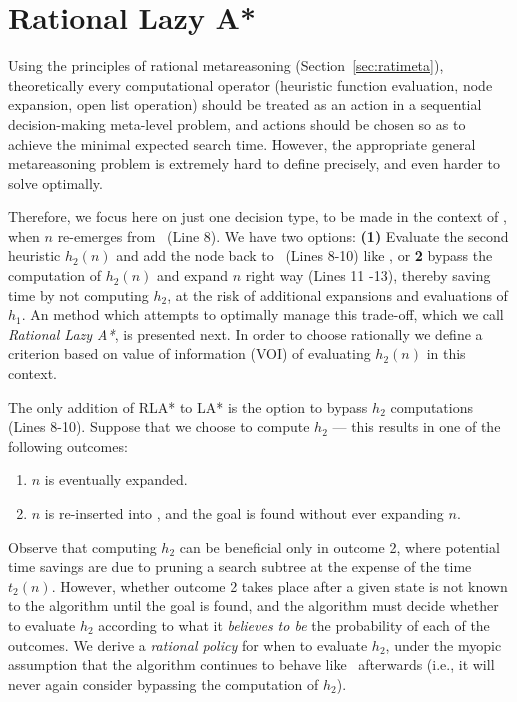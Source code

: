 \section{Rational Lazy A*}

Using the principles of rational metareasoning (Section~\ref{sec:ratimeta}),
theoretically every computational operator (heuristic function evaluation, node
expansion, open list operation) should be treated as an action in a sequential
decision-making meta-level problem, and actions should be chosen so as to
achieve the minimal expected search time. However, the appropriate
general metareasoning problem is extremely hard to define precisely, and even harder
to solve optimally.

Therefore, we focus here on just one decision type, to be
made in the context of \lazyastar, when $n$ re-emerges from \OPEN~(Line 8).
We have two options: {\bf (1)}  Evaluate the second heuristic $h_2(n)$ and add
the node back to \OPEN~(Lines 8-10) like \lazyastar, or {\bf 2} bypass the
computation of $h_2(n)$ and expand $n$ right way (Lines 11 -13), thereby
saving time by not computing $h_2$, at the risk of additional expansions and evaluations of $h_1$.
An method which attempts to
optimally manage this trade-off, which we call \textit{Rational Lazy A*}, is presented next.
In order to choose rationally we define a criterion based on value of
information (VOI) of evaluating $h_2(n)$ in this context.

The only addition of RLA* to LA* is the option to bypass $h_2$ computations (Lines 8-10).
Suppose that we choose to compute $h_2$ --- this results in one of the
following outcomes:
\begin{enumerate}
\item $n$ is eventually expanded.
\item $n$ is re-inserted into \OPEN, and the goal is found without ever expanding $n$.
\end{enumerate}

Observe that computing $h_2$ can be beneficial only in outcome 2, where
potential time savings are due to pruning a search subtree at the expense of
the time $t_2(n)$. However, whether outcome 2 takes place after a given state
is not known to the algorithm until the goal is found, and the algorithm must
decide whether to evaluate $h_2$ according to what it \textit{believes to be}
the probability of each of the outcomes. We derive a \textit{rational policy}
for when to evaluate $h_2$, under the myopic assumption that the algorithm
continues to behave like \lazyastar~afterwards (i.e., it will never again
consider bypassing the computation of $h_2$).


